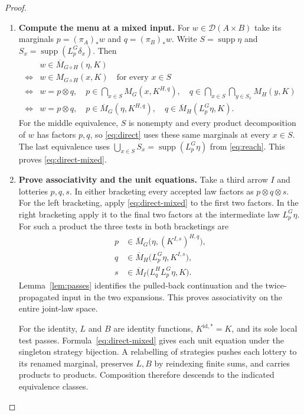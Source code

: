 \documentclass[11pt,a4paper]{article}
\theoremstyle{definition}
\newcommand{\D}{\mathcal D}
\newcommand{\supp}{\operatorname{supp}}
\begin{document}
\begin{proof}\leavevmode
    \begin{enumerate}[titledsteps]
        \item \textbf{Compute the menu at a mixed input.} For $w\in\D(A\times B)$ take its marginals $p=(\pi_A)_*w$ and $q=(\pi_B)_*w$. Write $S=\supp\eta$ and $S_x=\supp(L_p^G\delta_x)$. Then
        \[
            \begin{aligned}
                &w\in\overline M_{G\diamond H}(\eta,K)\\
                \iff{}& w\in M_{G\diamond H}(x,K)\quad\text{for every }x\in S\\
                \iff{}& w=p\otimes q,\quad
                p\in\bigcap_{x\in S}M_G(x,K^{H,q}),\quad
                q\in\bigcap_{x\in S}\bigcap_{y\in S_x}M_H(y,K)\\
                \iff{}& w=p\otimes q,\quad
                p\in\overline M_G(\eta,K^{H,q}),\quad
                q\in\overline M_H(L_p^G\eta,K).
            \end{aligned}
        \]
        For the middle equivalence, $S$ is nonempty and every product decomposition of $w$ has factors $p,q$, so \eqref{eq:direct} uses these same marginals at every $x\in S$. The last equivalence uses $\bigcup_{x\in S}S_x=\supp(L_p^G\eta)$ from \eqref{eq:reach}. This proves \eqref{eq:direct-mixed}.

        \item \textbf{Prove associativity and the unit equations.} Take a third arrow $I$ and lotteries $p,q,s$. In either bracketing every accepted law factors as $p\otimes q\otimes s$. For the left bracketing, apply \eqref{eq:direct-mixed} to the first two factors. In the right bracketing apply it to the final two factors at the intermediate law $L_p^G\eta$. For such a product the three tests in both bracketings are
        \begin{align*}
            p&\in\overline M_G\bigl(\eta,(K^{I,s})^{H,q}\bigr),\\
            q&\in\overline M_H\bigl(L_p^G\eta,K^{I,s}\bigr),\\
            s&\in\overline M_I\bigl(L_q^H L_p^G\eta,K\bigr).
        \end{align*}
        Lemma~\ref{lem:passes} identifies the pulled-back continuation and the twice-propagated input in the two expansions. This proves associativity on the entire joint-law space.

        For the identity, $L$ and $B$ are identity functions, $K^{\mathrm{id},*}=K$, and its sole local test passes. Formula~\eqref{eq:direct-mixed} gives each unit equation under the singleton strategy bijection. A relabelling of strategies pushes each lottery to its renamed marginal, preserves $L,B$ by reindexing finite sums, and carries products to products. Composition therefore descends to the indicated equivalence classes.


\end{enumerate}
\end{proof}
\end{document}
